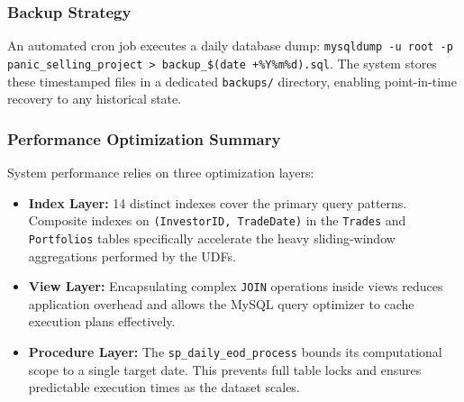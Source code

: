 \subsubsection{Backup Strategy}
An automated cron job executes a daily database dump: 
\texttt{mysqldump -u root -p panic\_selling\_project > backup\_\$(date +\%Y\%m\%d).sql}. 
The system stores these timestamped files in a dedicated \texttt{backups/} directory, enabling point-in-time recovery to any historical state.

\subsubsection{Performance Optimization Summary}
System performance relies on three optimization layers:
\begin{itemize}
    \item \textbf{Index Layer:} 14 distinct indexes cover the primary query patterns. Composite indexes on \texttt{(InvestorID, TradeDate)} in the \texttt{Trades} and \texttt{Portfolios} tables specifically accelerate the heavy sliding-window aggregations performed by the UDFs.
    \item \textbf{View Layer:} Encapsulating complex \texttt{JOIN} operations inside views reduces application overhead and allows the MySQL query optimizer to cache execution plans effectively.
    \item \textbf{Procedure Layer:} The \texttt{sp\_daily\_eod\_process} bounds its computational scope to a single target date. This prevents full table locks and ensures predictable execution times as the dataset scales.
\end{itemize}